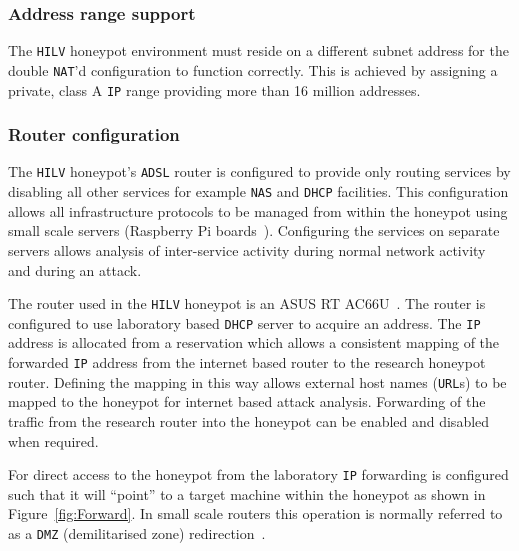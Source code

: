\subsubsection{Address range support}

The \texttt{HILV} honeypot environment must reside on a different subnet
address for the double \texttt{NAT}'d configuration to function correctly. This
is achieved by assigning a private, class A \texttt{IP} range providing more
than 16 million addresses.

\subsubsection{Router configuration}

The \texttt{HILV} honeypot's \texttt{ADSL} router is configured to provide only
routing services by disabling all other services for example \texttt{NAS} and
\texttt{DHCP} facilities. This configuration allows all infrastructure
protocols to be managed from within the honeypot using small scale servers
(Raspberry Pi boards~\cite{RASP:17}). Configuring the services on separate
servers allows analysis of inter-service activity during normal network
activity and during an attack.

The router used in the \texttt{HILV} honeypot is an ASUS RT
AC66U~\cite{ASUS:17}. The router is configured to use laboratory based
\texttt{DHCP} server to acquire an  address. The \texttt{IP} address is
allocated from a reservation which allows a consistent mapping of the forwarded
\texttt{IP} address from the internet based router to the research honeypot
router. Defining the mapping in this way allows external host names
(\texttt{URL}s) to be mapped to the honeypot for internet based attack
analysis. Forwarding of the traffic from the research router into the honeypot
can be enabled and disabled when required.

For direct access to the honeypot from the laboratory \texttt{IP} forwarding is
configured such that it will ``point'' to a target machine within the honeypot
as shown in Figure~\ref{fig:Forward}. In small scale routers this operation is
normally referred to as a \texttt{DMZ} (demilitarised zone)
redirection~\cite{DK:08,MB:01}.

